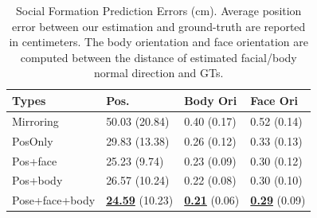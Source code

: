 \begin{table}[t]
	\centering
	\begin{tabular}{l| l| l| l}
		\hline
		Types & Pos. & Body Ori & Face Ori\\
		\hline
		Mirroring &  50.03 (20.84) & 0.40 (0.17) & 0.52 (0.14) \\
		\hline
		PosOnly & 29.83 (13.38) & 0.26 (0.12) & 0.33 (0.13) \\
		\hline
		Pos+face & 25.23 (9.74) & 0.23 (0.09) & 0.30 (0.12) \\
		\hline
		Pos+body & 26.57 (10.24) & 0.22 (0.08) & 0.30 (0.10) \\
		\hline
		Pose+face+body & \underline {\textbf{24.59}} (10.23) &  \underline {\textbf{0.21}} (0.06) &  \underline {\textbf{0.29}} (0.09) \\
		\hline
	\end{tabular}
	\label{table:predForm_errors}
	\caption{Social Formation Prediction Errors (cm). Average position error between our estimation and ground-truth are reported in centimeters. The body orientation and face orientation are computed between the distance of estimated facial/body normal direction and GTs.}
\end{table}










